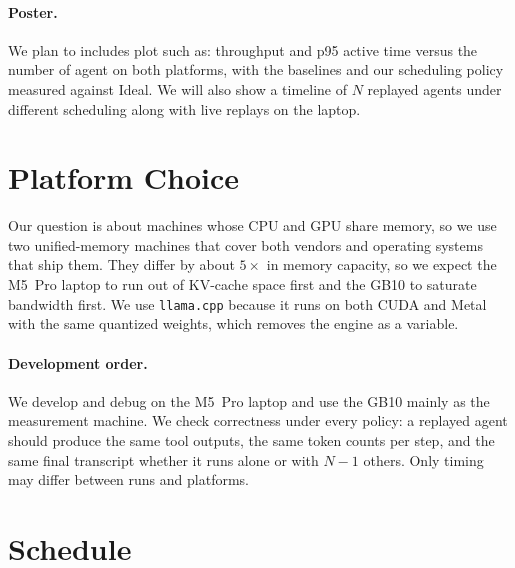 \documentclass[11pt]{article}
\newcommand{\code}[1]{\texttt{#1}}
\begin{document}
\paragraph{Poster.}
We plan to includes plot such as: throughput and p95 active time versus the number of agent on both platforms, 
with the baselines and our scheduling policy measured against Ideal. 
We will also show a timeline of $N$ replayed agents under different scheduling along with live replays on the laptop.
 
\section*{Platform Choice}
Our question is about machines whose CPU and GPU share memory, so we use two unified-memory machines that cover both vendors and operating systems that ship them. 
They differ by about $5\times$ in memory capacity, so we expect the M5~Pro laptop to run out of KV-cache space first and the GB10 to saturate
bandwidth first.
We use \code{llama.cpp} because it runs on both CUDA and Metal with the same quantized weights, which removes the engine as a variable.
 
\paragraph{Development order.}
We develop and debug on the M5~Pro laptop and use the GB10 mainly as the measurement machine. We check correctness under every policy: a replayed agent should produce the same tool outputs, the same token counts per step, and the same final transcript whether it runs alone or with $N-1$ others. Only timing may differ between runs and platforms.
 
\section*{Schedule}
 
\end{document}
